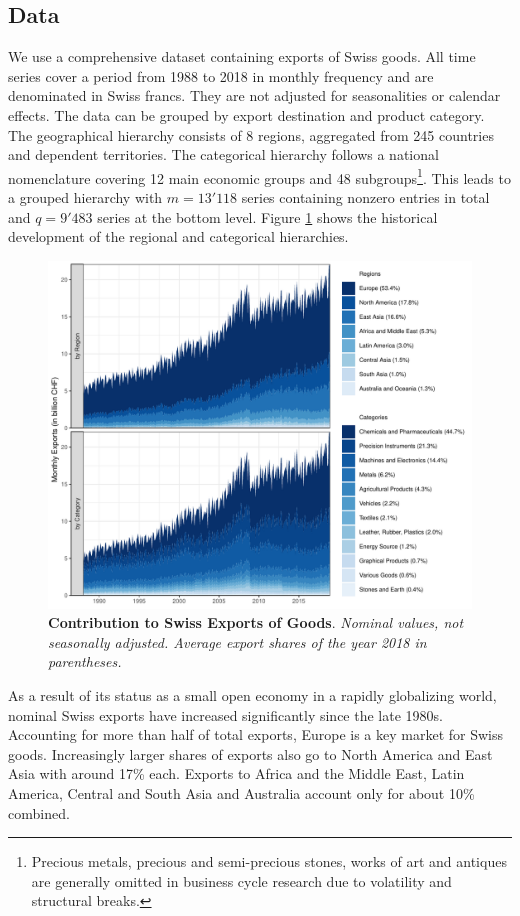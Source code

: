 \documentclass[a4paper,fleqn,11pt]{article}
\begin{document}
\subsection{Data}
We use a comprehensive dataset containing exports of Swiss goods. All time series cover a period from 1988 to 2018 in monthly frequency and are denominated in Swiss francs. They are not adjusted for seasonalities or calendar effects. The data can be grouped by export destination and product category. The geographical hierarchy consists of 8 regions, aggregated from 245 countries and dependent territories. The categorical hierarchy follows a national nomenclature covering 12 main economic groups and 48 subgroups\footnote{Precious metals, precious and semi-precious stones, works of art and antiques are generally omitted in business cycle research due to volatility and structural breaks.}. This leads to a grouped hierarchy with $m = 13'118$ series containing nonzero entries in total and $q = 9'483$ series at the bottom level. Figure \ref{fig:area} shows the historical development of the regional and categorical hierarchies.
\begin{figure}[H]
	\includegraphics[width=\textwidth]{fig/fig_area}
	\caption[Contribution to Swiss Exports of Goods]{\textbf{Contribution to Swiss Exports of Goods}. \textit{Nominal values, not seasonally adjusted. Average export shares of the year 2018 in parentheses.}}\label{fig:area}
\end{figure}
As a result of its status as a small open economy in a rapidly globalizing world, nominal Swiss exports have increased significantly since the late 1980s. Accounting for more than half of total exports, Europe is a key market for Swiss goods. Increasingly larger shares of exports also go to North America and East Asia with around 17\% each. Exports to Africa and the Middle East, Latin America, Central and South Asia and Australia account only for about 10\% combined.
\end{document}
